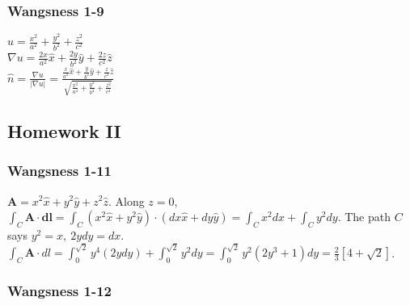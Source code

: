 \documentclass[oneside]{book}
\theoremstyle{definition}
\newcommand*\B[1]{\mathbf{#1}}
\begin{document}
\subsubsection{Wangsness 1-9}

$u = \frac{x^2}{a^2} + \frac{y^2}{b^2} + \frac{z^2}{c^2}$ \\
$\nabla u = \frac{2x}{a^2}\hat{x} + \frac{2y}{b^2}\hat{y} + \frac{2z}{c^2}\hat{z}$\\
$\hat{n} = \frac{\nabla u}{|\nabla u|} = \frac{\frac{x}{a^2}\hat{x} + \frac{y}{b^2}\hat{y}+\frac{z}{c^2}\hat{z}}{\sqrt{\frac{x^2}{a^4}+\frac{y^2}{b^4}+\frac{z^2}{c^4}}}$


\subsection*{Homework II}

\subsubsection{Wangsness 1-11}

$\B{A} = x^2\hat{x}+y^2\hat{y}+z^2\hat{z}$. Along $z=0$, $\int_C \B{A}\cdot\B{dl} = \int_C(x^2 \hat{x}+y^2\hat{y})\cdot(dx\hat{x}+dy\hat{y}) = \int_C x^2 dx + \int_C y^2 dy$. The path $C$ says $y^2 = x,\ 2ydy = dx$. $\int_C \B{A}\cdot{dl} = \int_{0}^{\sqrt{2}}y^4(2ydy) +\int_{0}^{\sqrt{2}}y^2 dy =\int_{0}^{\sqrt{2}}y^2(2y^3+1)dy= \frac{2}{3}[4+\sqrt{2}]$. 

\begin{figure}[!h]
  \centering
  \hfill
\end{figure}

\subsubsection{Wangsness 1-12}
\end{document}
